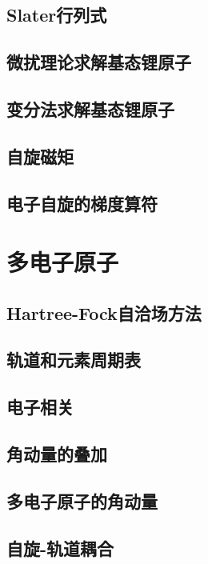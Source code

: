 \documentclass{book}
\begin{document}
	\section{Slater行列式}
	
	\section{微扰理论求解基态锂原子}
	
	\section{变分法求解基态锂原子}
	
	\section{自旋磁矩}
	
	\section{电子自旋的梯度算符}
	
	\chapter{多电子原子}
	\section{Hartree-Fock自洽场方法}
	
	\section{轨道和元素周期表}
	
	\section{电子相关}
	
	\section{角动量的叠加}
	
	\section{多电子原子的角动量}
	
	\section{自旋-轨道耦合}
	
\end{document}
